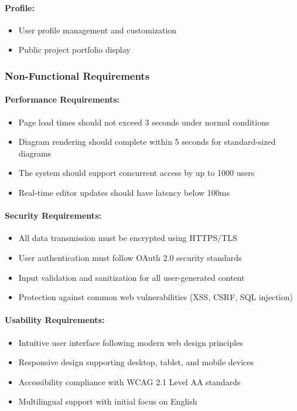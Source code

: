 \paragraph{Profile:}
\begin{itemize}
    \item User profile management and customization
    \item Public project portfolio display
 \end{itemize}

\subsubsection{Non-Functional Requirements}

\paragraph{Performance Requirements:}
\begin{itemize}
    \item Page load times should not exceed 3 seconds under normal conditions
    \item Diagram rendering should complete within 5 seconds for standard-sized diagrams
    \item The system should support concurrent access by up to 1000 users
    \item Real-time editor updates should have latency below 100ms
\end{itemize}

\paragraph{Security Requirements:}
\begin{itemize}
    \item All data transmission must be encrypted using HTTPS/TLS
    \item User authentication must follow OAuth 2.0 security standards
    \item Input validation and sanitization for all user-generated content
    \item Protection against common web vulnerabilities (XSS, CSRF, SQL injection)
\end{itemize}

\paragraph{Usability Requirements:}
\begin{itemize}
    \item Intuitive user interface following modern web design principles
    \item Responsive design supporting desktop, tablet, and mobile devices
    \item Accessibility compliance with WCAG 2.1 Level AA standards
    \item Multilingual support with initial focus on English
\end{itemize}


